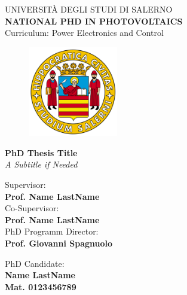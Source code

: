 \documentclass[a4paper, 12pt, twoside]{book}
\begin{document}
\begin{titlepage}
    \begin{center}
        \LARGE{\uppercase{Università degli Studi di Salerno}}\\
        \vspace{5mm}
        \large{\textbf{NATIONAL PHD IN PHOTOVOLTAICS}}\\
        \normalsize{Curriculum: Power Electronics and Control}
    \end{center}

    \vspace{10mm}
    \begin{figure}[H]
        \centering
        \includegraphics[width=0.35\textwidth]{logo_unisa}
    \end{figure}
    
    \vspace{10mm}
    \begin{center}
        {\Huge \bfseries PhD Thesis Title}\\
        \vspace{5mm}
        \Large{\textit{A Subtitle if Needed}}\\
        \vspace{10mm}
    \end{center}
    
    \noindent
    \begin{minipage}[t]{0.47\textwidth}
        {\large{Supervisor:\\ \bf Prof. Name LastName}}\\[8mm]
        {\large{Co-Supervisor:\\ \bf Prof. Name LastName}}\\[8mm]
        {\large{PhD Programm Director:\\ \bf Prof. Giovanni Spagnuolo}}
    \end{minipage}
    \hfill
    \begin{minipage}[t]{0.4\textwidth}\raggedleft
        {\large{PhD Candidate: \\ \bf Name LastName\\ Mat. 0123456789}}
    \end{minipage}
    
    \vfill
\end{titlepage}
\end{document}
